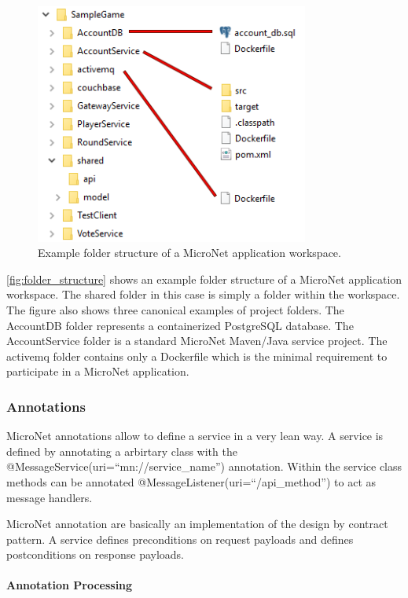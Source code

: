 \begin{figure}
	\centering
	\includegraphics[width=9cm]{images/tools/folder_structure}
	\caption{Example folder structure of a MicroNet application workspace.}
	\label{fig:folder_structure}
\end{figure}

\autoref{fig:folder_structure} shows an example folder structure of a MicroNet
application workspace. The shared folder in this case is simply a folder within the
workspace. The figure also shows three canonical examples of project folders.
The AccountDB folder represents a containerized PostgreSQL database. The
AccountService folder is a standard MicroNet Maven/Java service project. The
activemq folder contains only a Dockerfile which is the minimal requirement to
participate in a MicroNet application.

\subsubsection{Annotations}

MicroNet annotations allow to define a service in a very lean way. A service is
defined by annotating a arbirtary class with the
@MessageService(uri=``mn://service\_name'') annotation. Within the service class
methods can be annotated @MessageListener(uri=``/api\_method'') to act as
message handlers. 

MicroNet annotation are basically an implementation of the design by contract
pattern. A service defines preconditions on request payloads and
defines postconditions on response payloads.
 
 \paragraph{Annotation Processing}
 
